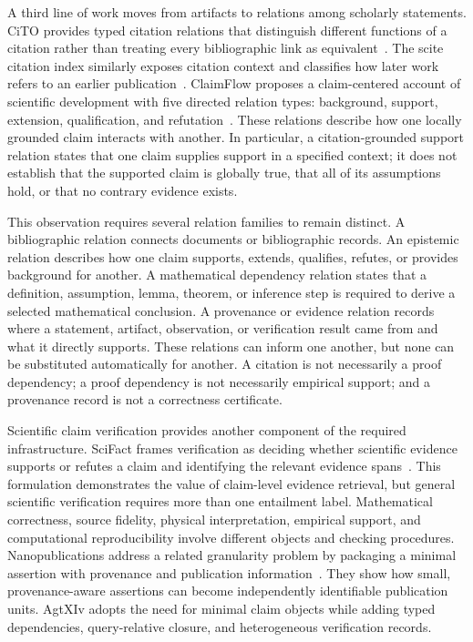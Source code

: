A third line of work moves from artifacts to relations among scholarly statements. CiTO provides typed citation relations that distinguish different functions of a citation rather than treating every bibliographic link as equivalent~\cite{shotton2010cito}. The scite citation index similarly exposes citation context and classifies how later work refers to an earlier publication~\cite{nicholson2021scite}. ClaimFlow proposes a claim-centered account of scientific development with five directed relation types: background, support, extension, qualification, and refutation~\cite{pramanick2026claimflow}. These relations describe how one locally grounded claim interacts with another. In particular, a citation-grounded support relation states that one claim supplies support in a specified context; it does not establish that the supported claim is globally true, that all of its assumptions hold, or that no contrary evidence exists.

This observation requires several relation families to remain distinct. A bibliographic relation connects documents or bibliographic records. An epistemic relation describes how one claim supports, extends, qualifies, refutes, or provides background for another. A mathematical dependency relation states that a definition, assumption, lemma, theorem, or inference step is required to derive a selected mathematical conclusion. A provenance or evidence relation records where a statement, artifact, observation, or verification result came from and what it directly supports. These relations can inform one another, but none can be substituted automatically for another. A citation is not necessarily a proof dependency; a proof dependency is not necessarily empirical support; and a provenance record is not a correctness certificate.

Scientific claim verification provides another component of the required infrastructure. SciFact frames verification as deciding whether scientific evidence supports or refutes a claim and identifying the relevant evidence spans~\cite{wadden2020scifact}. This formulation demonstrates the value of claim-level evidence retrieval, but general scientific verification requires more than one entailment label. Mathematical correctness, source fidelity, physical interpretation, empirical support, and computational reproducibility involve different objects and checking procedures. Nanopublications address a related granularity problem by packaging a minimal assertion with provenance and publication information~\cite{kuhn2016nanopublications}. They show how small, provenance-aware assertions can become independently identifiable publication units. AgtXIv adopts the need for minimal claim objects while adding typed dependencies, query-relative closure, and heterogeneous verification records.


